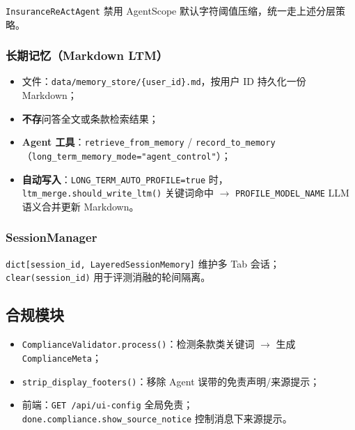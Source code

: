 \documentclass[11pt,a4paper]{ctexart}
\begin{document}
\texttt{InsuranceReActAgent} 禁用 AgentScope 默认字符阈值压缩，统一走上述分层策略。

\subsubsection{长期记忆（Markdown LTM）}

\begin{itemize}[nosep]
  \item 文件：\texttt{data/memory\_store/\{user\_id\}.md}，按用户 ID 持久化一份 Markdown；
  \item \textbf{不存}问答全文或条款检索结果；
  \item \textbf{Agent 工具}：\texttt{retrieve\_from\_memory} / \texttt{record\_to\_memory}（\texttt{long\_term\_memory\_mode="agent\_control"}）；
  \item \textbf{自动写入}：\texttt{LONG\_TERM\_AUTO\_PROFILE=true} 时，\texttt{ltm\_merge.should\_write\_ltm()} 关键词命中 $\rightarrow$ \texttt{PROFILE\_MODEL\_NAME} LLM 语义合并更新 Markdown。
\end{itemize}

\subsubsection{SessionManager}

\texttt{dict[session\_id, LayeredSessionMemory]} 维护多 Tab 会话；\texttt{clear(session\_id)} 用于评测消融的轮间隔离。

\subsection{合规模块}

\begin{itemize}[nosep]
  \item \texttt{ComplianceValidator.process()}：检测条款类关键词 $\rightarrow$ 生成 \texttt{ComplianceMeta}；
  \item \texttt{strip\_display\_footers()}：移除 Agent 误带的免责声明/来源提示；
  \item 前端：\texttt{GET /api/ui-config} 全局免责；\texttt{done.compliance.show\_source\_notice} 控制消息下来源提示。
\end{itemize}

\end{document}
